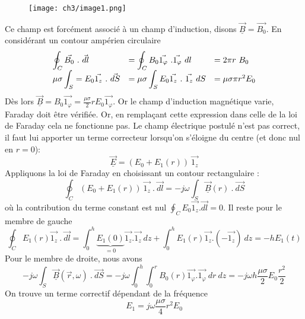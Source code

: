 	\begin{wrapfigure}[7]{l}{5.15cm}
	\vspace{-5mm}
	\texttt{[image: ch3/image1.png]}
	\end{wrapfigure}
Ce champ est forcément associé à un champ d'induction, disons $\vec{\underline{B}}=\vec{B_0}$. 
En considérant un contour ampérien circulaire
\begin{equation}
\begin{array}{lll}
\DS \oint_C \vec{B_0}\ .\ \vec{dl} &=\DS \oint_C B_0\vec{1_\varphi}\ . \vec{1_\varphi}\ dl &= 2\pi 
r\ B_0\\
\DS\mu\sigma\int_S = E_0\vec{1_z}\ .\ \vec{dS} &=\DS \mu\sigma\int_S E_0\vec{1_z}\ .\ \vec{1_z}\ dS 
&= \mu\sigma \pi r^2 E_0
\end{array}
\end{equation}
Dès lors $\vec{\underline{B}} = B_0\vec{1_\varphi} = \frac{\mu\sigma}{2}rE_0\vec{1_\varphi}$. Or 
le champ d'induction magnétique varie, Faraday doit être vérifiée. Or, en remplaçant cette 
expression dans celle de la loi de Faraday cela ne fonctionne pas. Le champ électrique postulé 
n'est pas correct, il faut lui apporter un terme correcteur lorsqu'on s'éloigne du centre (et 
donc nul en $r=0$):
\begin{equation}
\vec{\underline{E}} = (E_0+E_1(r))\ \vec{1_z}
\end{equation}
Appliquons la loi de Faraday en choisissant un contour rectangulaire :
\begin{equation}
\oint_C (E_0+E_1(r))\ \vec{1_z}\ .\ \vec{dl} = -j\omega\int_S\underline{\vec{B}}(r)\ .\ \vec{dS}
\end{equation}
où la contribution du terme constant est nul $\oint_C E_0\vec{1_z} . \vec{dl}=0$. Il reste pour le membre de
gauche
\begin{equation}
\oint_C E_1(r)\vec{1_z}\ .\ \vec{dl} = \int_0^h \underbrace{E_1(0)}_{=0}\vec{1_z}.\vec{1_z}\ dz +
\int_0^h E_1(r)\vec{1_z}.(-\vec{1_z})\ dz = -hE_1(t)
\end{equation}
Pour le membre de droite, nous avons
\begin{equation}
-j\omega \int_S \vec{\underline{B}}(\vec{r},\omega)\ .\ \vec{dS} = -j\omega \int_0^h\int_0^r 
B_0(r)\vec{1_\varphi}.\vec{1_\varphi}\ dr\ dz = -j\omega h\dfrac{\mu\sigma}{2}E_0\dfrac{r^2}{2}
\end{equation}
On trouve un terme correctif dépendant de la fréquence
\begin{equation}
E_1 = j\omega\dfrac{\mu\sigma}{4}r^2E_0
\end{equation}
